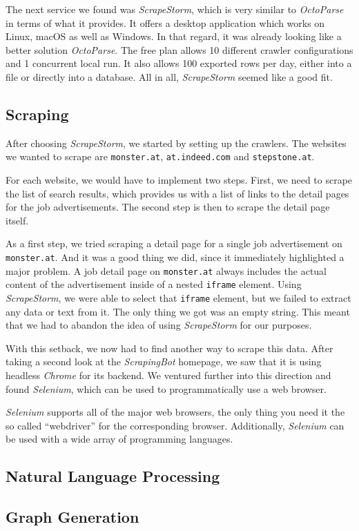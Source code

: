 \documentclass[runningheads]{llncs}
\begin{document}
The next service we found was \textit{ScrapeStorm}, which is very similar to \textit{OctoParse} in terms of what it provides. It offers a desktop application which works on Linux, macOS as well as Windows. In that regard, it was already looking like a better solution \textit{OctoParse}. The free plan allows 10 different crawler configurations and 1 concurrent local run. It also allows 100 exported rows per day, either into a file or directly into a database. All in all, \textit{ScrapeStorm} seemed like a good fit.

\subsection{Scraping}
\label{sub:scraping}

After choosing \textit{ScrapeStorm}, we started by setting up the crawlers. The websites we wanted to scrape are \texttt{monster.at}, \texttt{at.indeed.com} and \texttt{stepstone.at}.

For each website, we would have to implement two steps. First, we need to scrape the list of search results, which provides us with a list of links to the detail pages for the job advertisements. The second step is then to scrape the detail page itself.

As a first step, we tried scraping a detail page for a single job advertisement on \texttt{monster.at}. And it was a good thing we did, since it immediately highlighted a major problem. A job detail page on \texttt{monster.at} always includes the actual content of the advertisement inside of a nested \texttt{iframe} element. Using \textit{ScrapeStorm}, we were able to select that \texttt{iframe} element, but we failed to extract any data or text from it. The only thing we got was an empty string. This meant that we had to abandon the idea of using \textit{ScrapeStorm} for our purposes.

With this setback, we now had to find another way to scrape this data. After taking a second look at the \textit{ScrapingBot} homepage, we saw that it is using headless \textit{Chrome} for its backend. We ventured further into this direction and found \textit{Selenium}, which can be used to programmatically use a web browser.

\textit{Selenium} supports all of the major web browsers, the only thing you need it the so called “webdriver” for the corresponding browser. Additionally, \textit{Selenium} can be used with a wide array of programming languages.

\subsection{Natural Language Processing}
\label{sub:natural_language_processing}


\subsection{Graph Generation}
\label{sub:graph_generation}
\end{document}
